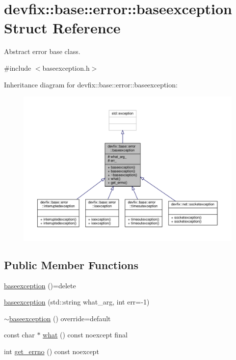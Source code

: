 \hypertarget{structdevfix_1_1base_1_1error_1_1baseexception}{}\section{devfix\+:\+:base\+:\+:error\+:\+:baseexception Struct Reference}
\label{structdevfix_1_1base_1_1error_1_1baseexception}


Abstract error base class.  




{\ttfamily \#include $<$baseexception.\+h$>$}



Inheritance diagram for devfix\+:\+:base\+:\+:error\+:\+:baseexception\+:\nopagebreak
\begin{figure}[H]
\begin{center}
\leavevmode
\includegraphics[width=350pt]{structdevfix_1_1base_1_1error_1_1baseexception__inherit__graph}
\end{center}
\end{figure}
\subsection*{Public Member Functions}
\begin{DoxyCompactItemize}
\item 
\hyperlink{structdevfix_1_1base_1_1error_1_1baseexception_abc1384f68bf47292ab520a96eedec596}{baseexception} ()=delete
\item 
\hyperlink{structdevfix_1_1base_1_1error_1_1baseexception_a34ac448cc55e4d9ce0ee4495abbb0f86}{baseexception} (std\+::string what\+\_\+arg, int err=-\/1)
\item 
\hyperlink{structdevfix_1_1base_1_1error_1_1baseexception_a3ae67c736d3268683cb92556c9f14bd7}{$\sim$baseexception} () override=default
\item 
const char $\ast$ \hyperlink{structdevfix_1_1base_1_1error_1_1baseexception_a16327152a55d65b1e537825231fbd452}{what} () const noexcept final
\item 
int \hyperlink{structdevfix_1_1base_1_1error_1_1baseexception_a1974deee894842b51ba42e15dbd0f8d1}{get\+\_\+errno} () const noexcept
\end{DoxyCompactItemize}
